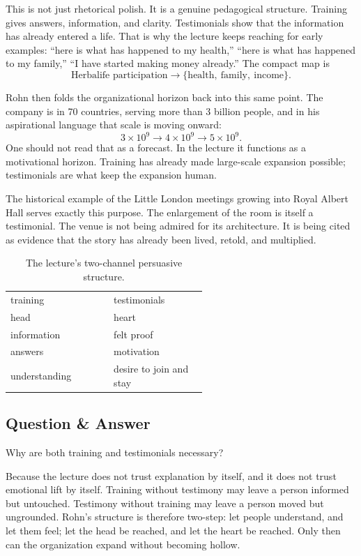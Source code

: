 This is not just rhetorical polish. It is a genuine pedagogical structure. Training gives answers, information, and clarity. Testimonials show that the information has already entered a life. That is why the lecture keeps reaching for early examples: ``here is what has happened to my health,'' ``here is what has happened to my family,'' ``I have started making money already.'' The compact map is
\begin{equation}
\text{Herbalife participation} \to \{\text{health},\ \text{family},\ \text{income}\}.
\end{equation}

Rohn then folds the organizational horizon back into this same point. The company is in 70 countries, serving more than 3 billion people, and in his aspirational language that scale is moving onward:
\begin{equation}
3\times 10^9 \to 4\times 10^9 \to 5\times 10^9.
\end{equation}
One should not read that as a forecast. In the lecture it functions as a motivational horizon. Training has already made large-scale expansion possible; testimonials are what keep the expansion human.

The historical example of the Little London meetings growing into Royal Albert Hall serves exactly this purpose. The enlargement of the room is itself a testimonial. The venue is not being admired for its architecture. It is being cited as evidence that the story has already been lived, retold, and multiplied.

\begin{table}[h]
\centering
\begin{tabular}{p{0.28\linewidth} p{0.28\linewidth}}
training & testimonials \\
head & heart \\
information & felt proof \\
answers & motivation \\
understanding & desire to join and stay
\end{tabular}
\caption{The lecture's two-channel persuasive structure.}
\end{table}

\subsection{Question \& Answer}

Why are both training and testimonials necessary?

Because the lecture does not trust explanation by itself, and it does not trust emotional lift by itself. Training without testimony may leave a person informed but untouched. Testimony without training may leave a person moved but ungrounded. Rohn's structure is therefore two-step: let people understand, and let them feel; let the head be reached, and let the heart be reached. Only then can the organization expand without becoming hollow.


